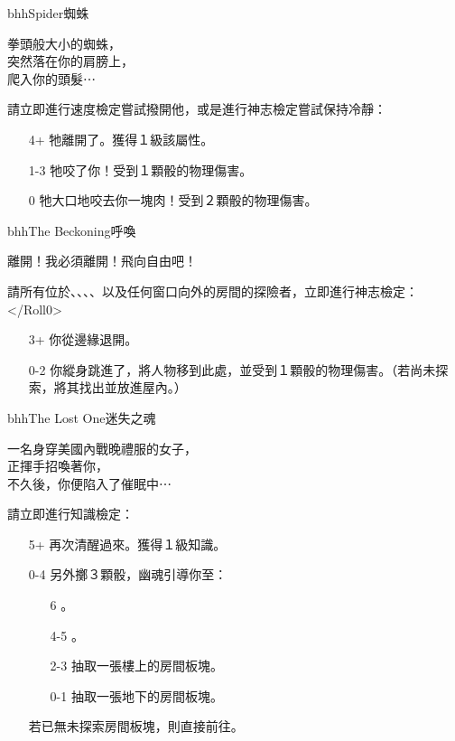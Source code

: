 \linebreak[0]%
\begin{EventCard}{bhh}{Spider}{蜘蛛}
  \begin{CardStory}
    拳頭般大小的蜘蛛，\\
    突然落在你的肩膀上，\\
    爬入你的頭髮⋯
  \end{CardStory}
  請立即進行速度檢定嘗試撥開他，或是進行神志檢定嘗試保持冷靜：
  \begin{itemize}
    \item[4+] 牠離開了。獲得１級該屬性。
    \item[1-3] 牠咬了你！受到１顆骰的物理傷害。
    \item[0] 牠大口地咬去你一塊肉！受到２顆骰的物理傷害。
  \end{itemize}
\end{EventCard}%
\linebreak[0]%
\begin{EventCard}{bhh}{The Beckoning}{呼喚}
  \begin{CardStory}
    離開！我必須離開！飛向自由吧！
  \end{CardStory}
  請所有位於、、、、以及任何窗口向外的房間的探險者，立即進行神志檢定：</Roll0>
  \begin{itemize}
    \item[3+] 你從邊緣退開。
    \item[0-2] 你縱身跳進了，將人物移到此處，並受到１顆骰的物理傷害。（若尚未探索，將其找出並放進屋內。）
  \end{itemize}
\end{EventCard}%
\linebreak[0]%
\begin{EventCard}{bhh}{The Lost One}{迷失之魂}
  \begin{CardStory}
    一名身穿美國內戰晚禮服的女子，\\
    正揮手招喚著你，\\
    不久後，你便陷入了催眠中⋯
  \end{CardStory}
  請立即進行知識檢定：
  \begin{itemize}
    \item[5+] 再次清醒過來。獲得１級知識。
    \item[0-4] 另外擲３顆骰，幽魂引導你至：
      \begin{itemize}
        \item[6] 。
        \item[4-5] 。
        \item[2-3] 抽取一張樓上的房間板塊。
        \item[0-1] 抽取一張地下的房間板塊。
      \end{itemize}
      若已無未探索房間板塊，則直接前往。
  \end{itemize}
\end{EventCard}%
